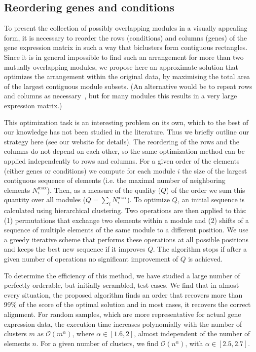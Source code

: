 \documentclass[round]{bioinfo}
\begin{document}
\subsection{Reordering genes and conditions}
To present the collection of possibly overlapping modules in a visually
appealing form, it is necessary to reorder the rows (conditions) and
columns (genes) of the gene expression matrix in such a way that biclusters form contiguous
rectangles. Since it is in general impossible to find such an
arrangement for more than two mutually overlapping modules, we propose
here an approximate solution that optimizes the arrangement within the
original data, by maximising the total area of the largest contiguous
module subsets. (An alternative would be to repeat rows and columns as
necessary~\citep{grothaus06}, but for many modules this results in
a very large expression matrix.)

This optimization task is an interesting problem on its own, which to
the best of our knowledge has not been studied in the literature. Thus
we briefly outline our strategy here (see our website for details).
The reordering of the rows and the columns do not depend on each
other, so the same optimization method can be applied independently
to rows and columns. For a given order of the
elements (either genes or conditions) we compute for each module $i$ the
size of the largest contiguous sequence of elements (i.e. the maximal
number of neighboring elements $N^\text{max}_i$). Then, as a measure of the
quality ($Q$) of the order we sum this quantity over all modules
($Q=\sum_i N^\text{max}_i$). To optimize $Q$, an initial sequence is calculated using
hierarchical clustering. Two operations are then applied to this: (1)
permutations that exchange two elements within a module and (2) shifts
of a sequence of multiple elements of the same module to a different position. We
use a greedy iterative scheme that performs these operations at
all possible positions and keeps the best new sequence if it improves
$Q$. The algorithm stops if after a given number of operations no
significant improvement of $Q$ is achieved.

To determine the efficiency of this method, we have studied a large
number of perfectly orderable, but initially scrambled, test cases. We
find that in almost every situation, the proposed algorithm finds an
order that recovers more than 99\% of the score of the optimal
solution and in most cases, it recovers the correct
alignment. For random samples, which are more representative for
actual gene expression data, the execution time increases polynomially
with the number of clusters $m$ as ${\mathcal O}(m^\alpha)$, where
$\alpha \in [1.6, 2]$, almost independent of the number of elements
$n$. For a given number of clusters, we find ${\mathcal O}(n^\alpha)$,
with $\alpha \in [2.5, 2.7]$.
\end{document}
